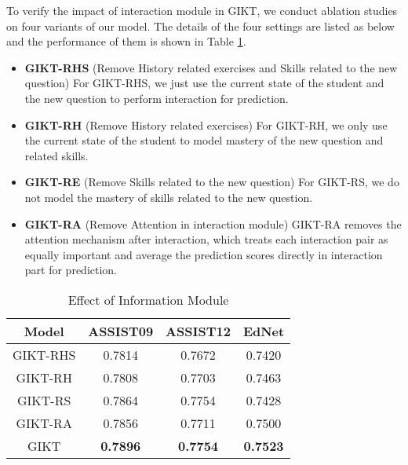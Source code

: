 \documentclass[runningheads]{llncs}
\begin{document}
To verify the impact of interaction module in GIKT, we conduct ablation studies on four variants of our model. The details of the four settings are listed as below and the performance of them is shown in Table \ref{tab:info}. 
\begin{itemize}
	
	
	\item \textbf{GIKT-RHS} (Remove History related exercises and Skills related to the new question) For GIKT-RHS, we just use the current state of the student and the new question to perform interaction for prediction.
	\item \textbf{GIKT-RH} (Remove History related exercises) For GIKT-RH, we only use the current state of the student to model mastery of the new question and related skills.
	\item \textbf{GIKT-RE} (Remove Skills related to the new question)  For GIKT-RS, we do not model the mastery of skills related to the new question.
	\item \textbf{GIKT-RA} (Remove Attention in interaction module)  GIKT-RA removes the attention mechanism after interaction, which treats each interaction pair as equally important and average the prediction scores directly in interaction part for prediction.
\end{itemize}

\begin{table}
	\centering
	\caption{Effect of Information Module}
\begin{tabular}{cccc}
		\hline
		Model & ASSIST09 & ASSIST12 & EdNet \\
		\hline
		
		\hline
		GIKT-RHS & 0.7814 & 0.7672 &  0.7420  \\
		GIKT-RH & 0.7808 & 0.7703  &  0.7463 \\
		GIKT-RS & 0.7864  & 0.7754 & 0.7428  \\
		GIKT-RA & 0.7856  & 0.7711 & 0.7500\\
		GIKT & \textbf{0.7896}  & \textbf{0.7754} &  \textbf{0.7523} \\
		\hline
	\end{tabular}
	\label{tab:info}
\end{table}
\end{document}
